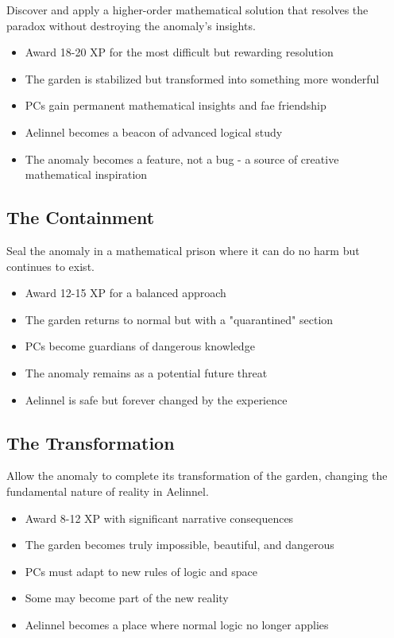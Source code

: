 \documentclass[11pt]{article}
\begin{document}
Discover and apply a higher-order mathematical solution that resolves the paradox without destroying the anomaly's insights.
\begin{itemize}
\item Award 18-20 XP for the most difficult but rewarding resolution
\item The garden is stabilized but transformed into something more wonderful
\item PCs gain permanent mathematical insights and fae friendship
\item Aelinnel becomes a beacon of advanced logical study
\item The anomaly becomes a feature, not a bug - a source of creative mathematical inspiration
\end{itemize}

\subsection{The Containment}

Seal the anomaly in a mathematical prison where it can do no harm but continues to exist.
\begin{itemize}
\item Award 12-15 XP for a balanced approach
\item The garden returns to normal but with a "quarantined" section
\item PCs become guardians of dangerous knowledge
\item The anomaly remains as a potential future threat
\item Aelinnel is safe but forever changed by the experience
\end{itemize}

\subsection{The Transformation}

Allow the anomaly to complete its transformation of the garden, changing the fundamental nature of reality in Aelinnel.
\begin{itemize}
\item Award 8-12 XP with significant narrative consequences
\item The garden becomes truly impossible, beautiful, and dangerous
\item PCs must adapt to new rules of logic and space
\item Some may become part of the new reality
\item Aelinnel becomes a place where normal logic no longer applies
\end{itemize}
\end{document}
